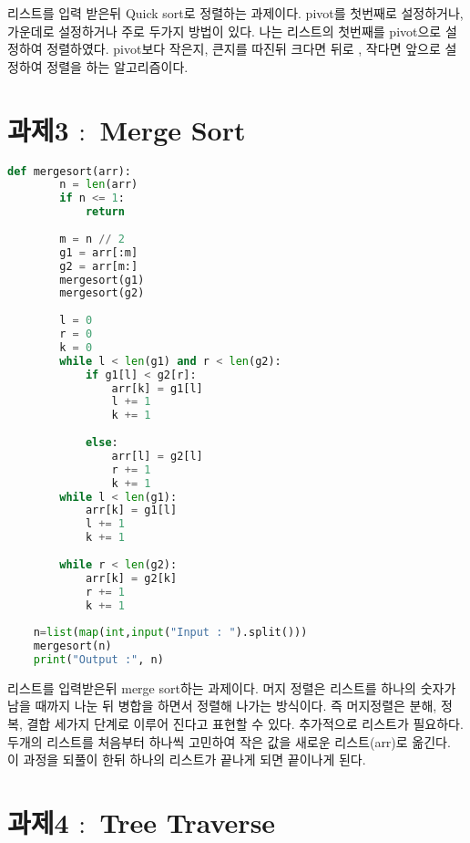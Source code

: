 \documentclass[letterpaper, 10 pt, conference]{ieeeconf}
\begin{document}
\small 리스트를 입력 받은뒤 Quick sort로 정렬하는 과제이다. pivot를 첫번째로 설정하거나, 가운데로 설정하거나 주로 두가지 방법이 있다. 나는 리스트의 첫번째를 pivot으로 설정하여 정렬하였다. pivot보다 작은지, 큰지를 따진뒤 크다면 뒤로 , 작다면 앞으로 설정하여 정렬을 하는 알고리즘이다. 

\section{과제3 $:$ Merge Sort}

\begin{lstlisting}[language=python]
       def mergesort(arr):
        n = len(arr)
        if n <= 1:
            return
    
        m = n // 2
        g1 = arr[:m]
        g2 = arr[m:]
        mergesort(g1)
        mergesort(g2)
    
        l = 0
        r = 0
        k = 0
        while l < len(g1) and r < len(g2):
            if g1[l] < g2[r]:
                arr[k] = g1[l]
                l += 1
                k += 1
    
            else:
                arr[l] = g2[l]
                r += 1
                k += 1
        while l < len(g1):
            arr[k] = g1[l]
            l += 1
            k += 1
    
        while r < len(g2):
            arr[k] = g2[k]
            r += 1
            k += 1
    
    n=list(map(int,input("Input : ").split()))
    mergesort(n)
    print("Output :", n)
\end{lstlisting}
\small 리스트를 입력받은뒤 merge sort하는 과제이다. 머지 정렬은 리스트를 하나의 숫자가 남을 때까지 나눈 뒤 병합을 하면서 정렬해 나가는 방식이다. 즉 머지정렬은 분해, 정복, 결합 세가지 단계로 이루어 진다고 표현할 수 있다. 추가적으로 리스트가 필요하다. 두개의 리스트를 처음부터 하나씩 고민하여 작은 값을 새로운 리스트(arr)로 옮긴다. 이 과정을 되풀이 한뒤 하나의 리스트가 끝나게 되면 끝이나게 된다. 
\section{과제4 $:$ Tree Traverse}
\end{document}
